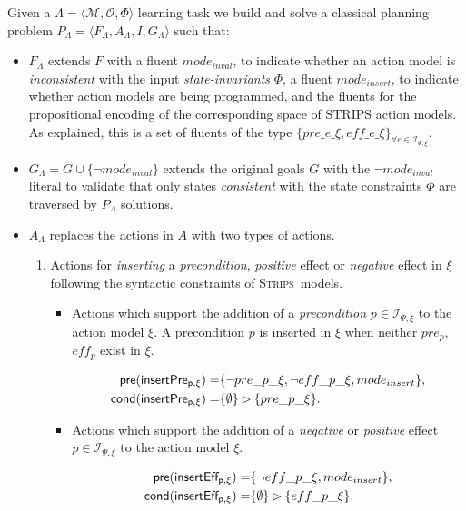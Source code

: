 \documentclass{article}
\newcommand{\tup}[1]{{\langle #1 \rangle}}
\newcommand{\pre}{\mathsf{pre}}     %
\newcommand{\cond}{\mathsf{cond}}   %
\newcommand{\strips}{\textsc{Strips}}
\begin{document}
Given a $\Lambda=\tup{\mathcal{M},{\mathcal O},\Phi}$ learning task we build and solve a classical planning problem $P_{\Lambda}=\tup{F_{\Lambda},A_{\Lambda},I,G_{\Lambda}}$ such that:
\begin{itemize}
\item $F_{\Lambda}$ extends $F$ with a fluent {\small$mode_{inval}$}, to indicate whether an action model is {\em inconsistent} with the input {\em state-invariants} $\Phi$, a fluent {\small$mode_{insert}$}, to indicate whether action models are being programmed, and the fluents for the propositional encoding of the corresponding space of STRIPS action models. As explained, this is a set of fluents of the type $\{pre\_e\_\xi, eff\_e\_\xi\}_{\forall e\in{\mathcal I}_{\Psi,\xi}}$.

\item $G_{\Lambda}= G\cup \{\neg mode_{inval}\}$ extends the original goals $G$ with the $\neg mode_{inval}$ literal to validate that only states {\em consistent} with the state constraints $\Phi$ are traversed by $P_{\Lambda}$ solutions.

\item $A_{\Lambda}$ replaces the actions in $A$ with two types of actions.
\begin{enumerate}
\item Actions for {\em inserting} a {\em precondition}, {\em positive} effect or {\em negative} effect in $\xi$ following the syntactic constraints of \strips\ models. 
\begin{itemize}
\item Actions which support the addition of a {\em precondition} $p\in {\mathcal I}_{\Psi,\xi}$ to the action model $\xi$. A precondition $p$ is inserted in $\xi$ when neither $pre_p$, $eff_p$ exist in $\xi$.

\begin{small}
\begin{align*}
\hspace*{7pt}\pre(\mathsf{insertPre_{p,\xi}})=&\{\neg pre\_p\_\xi, \neg eff\_p\_\xi, mode_{insert}\},\\
\cond(\mathsf{insertPre_{p,\xi}})=&\{\emptyset\}\rhd\{pre\_p\_\xi\}.
\end{align*}
\end{small}

\item Actions which support the addition of a {\em negative} or {\em positive} effect $p\in {\mathcal I}_{\Psi,\xi}$ to the action model $\xi$. 

\begin{small}
\begin{align*}
\hspace*{7pt}\pre(\mathsf{insertEff_{p,\xi}})=&\{\neg eff\_p\_\xi, mode_{insert}\},\\
\cond(\mathsf{insertEff_{p,\xi}})=&\{\emptyset\}\rhd\{eff\_p\_\xi\}.
\end{align*}
\end{small}
\end{itemize}


\end{enumerate}
\end{itemize}
\end{document}
